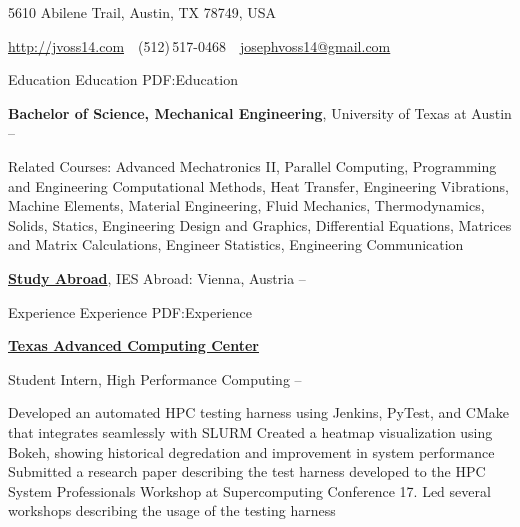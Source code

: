 \documentclass[letterpaper,MMMyyyy,nonstopmode]{simpleresumecv}
\newcommand{\CVAuthor}{Joseph Voss}
\newcommand{\CVWebpage}{http://jvoss14.com}
\begin{document}

\Title{\CVAuthor}

\begin{SubTitle}
{5610 Abilene Trail, Austin, TX 78749, USA}
\par
\href{\CVWebpage}
{\url{\CVWebpage}}
\,\SubBulletSymbol\,
(512)\,517-0468
\,\SubBulletSymbol\,
\href{mailto:josephvoss14@gmail.com}
{josephvoss14@gmail.com}

\end{SubTitle}

\begin{Body}


\Section
{Education}
{Education}
{PDF:Education}

\Entry
{\textbf{Bachelor of Science, Mechanical Engineering}},
University of Texas at Austin
\hfill
{} --

\Gap
\begin{Detail}
Related Courses:
Advanced Mechatronics II, Parallel Computing, Programming and Engineering Computational Methods, Heat Transfer, Engineering Vibrations, Machine Elements, Material Engineering, Fluid Mechanics, Thermodynamics, Solids, Statics, Engineering Design and Graphics, Differential Equations, Matrices and Matrix Calculations, Engineer Statistics, Engineering Communication
\end{Detail}

\BigGap
\Entry
\href{http://www.example.com/my-college}
{\textbf{Study Abroad}},
IES Abroad: Vienna, Austria
\hfill
{} -- 


\Section
{Experience}
{Experience}
{PDF:Experience}

\Entry
\href{http://tacc.utexas.edu}
{\textbf{Texas Advanced Computing Center}}

\Gap
\BulletItem
Student Intern, High Performance Computing
\hfill
{} --
\begin{Detail}
\SubBulletItem
Developed an automated HPC testing harness using Jenkins, PyTest, and CMake \newline
that integrates seamlessly with SLURM
\SubBulletItem
Created a heatmap visualization using Bokeh, showing historical degredation and \newline 
improvement in system performance
\SubBulletItem
Submitted a research paper describing the test harness developed 
\newline to the HPC System Professionals Workshop at Supercomputing Conference 17.
\SubBulletItem
Led several workshops describing the usage of the testing harness
\end{Detail}


\end{Body}
\end{document}
